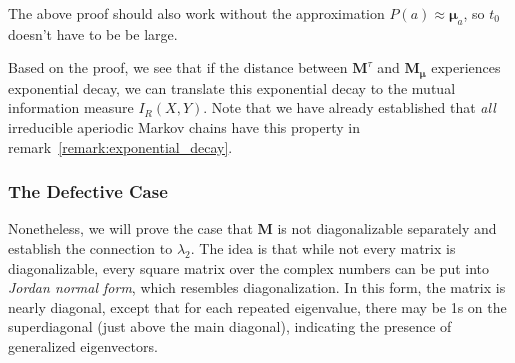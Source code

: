 \documentclass[../../main.tex]{subfiles}
\begin{document}
    \bigskip
    \begin{remark}
        The above proof should also work without the approximation $P(a) \approx \bm{\mu}_a$, so $t_0$ doesn't have to be  be large.
    \end{remark}

    \begin{remark}
        Based on the proof, we see that if the distance between $\bm{M}^\tau$ and $\bm{M_\mu}$ experiences exponential decay, we can translate this exponential decay to the mutual information measure $I_R(X, Y)$. Note that we have already established that \emph{all} irreducible aperiodic Markov chains have this property in remark~\ref{remark:exponential_decay}.
    \end{remark}

\subsubsection{The Defective Case}
    \label{section:the_defectvie_case}
    Nonetheless, we will prove the case that $\bm{M}$ is not diagonalizable separately and establish the connection to $\lambda_2$. The idea is that while not every matrix is diagonalizable, every square matrix over the complex numbers can be put into \emph{Jordan normal form}, which resembles diagonalization. In this form, the matrix is nearly diagonal, except that for each repeated eigenvalue, there may be 1s on the superdiagonal (just above the main diagonal), indicating the presence of generalized eigenvectors.
\end{document}
